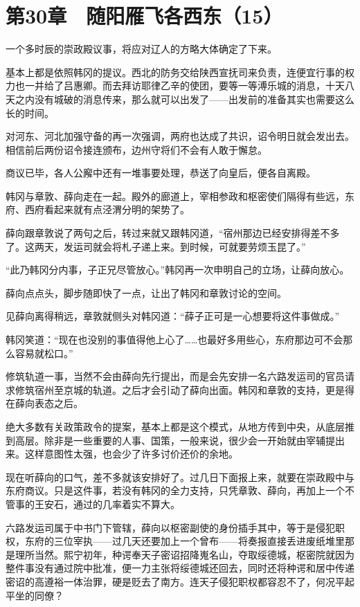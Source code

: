 \section{第30章　随阳雁飞各西东（15）}

一个多时辰的崇政殿议事，将应对辽人的方略大体确定了下来。

基本上都是依照韩冈的提议。西北的防务交给陕西宣抚司来负责，连便宜行事的权力也一并给了吕惠卿。而去拜访耶律乙辛的使团，要等一等溥乐城的消息，十天八天之内没有城破的消息传来，那么就可以出发了——出发前的准备其实也需要这么长的时间。

对河东、河北加强守备的再一次强调，两府也达成了共识，诏令明日就会发出去。相信前后两份诏令接连颁布，边州守将们不会有人敢于懈怠。

商议已毕，各人公廨中还有一堆事要处理，恭送了向皇后，便各自离殿。

韩冈与章敦、薛向走在一起。殿外的廊道上，宰相参政和枢密使们隔得有些远，东府、西府看起来就有点泾渭分明的架势了。

薛向跟章敦说了两句之后，转过来就又跟韩冈道，“宿州那边已经安排得差不多了。这两天，发运司就会将札子递上来。到时候，可就要劳烦玉昆了。”

“此乃韩冈分内事，子正兄尽管放心。”韩冈再一次申明自己的立场，让薛向放心。

薛向点点头，脚步随即快了一点，让出了韩冈和章敦讨论的空间。

见薛向离得稍远，章敦就侧头对韩冈道：“薛子正可是一心想要将这件事做成。”

韩冈笑道：“现在也没别的事值得他上心了……也最好多用些心，东府那边可不会那么容易就松口。”

修筑轨道一事，当然不会由薛向先行提出，而是会先安排一名六路发运司的官员请求修筑宿州至京城的轨道。之后才会引动了薛向出面。韩冈和章敦的支持，更是得在薛向表态之后。

绝大多数有关政策政令的提案，基本上都是这个模式，从地方传到中央，从底层推到高层。除非是一些重要的人事、国策，一般来说，很少会一开始就由宰辅提出来。这样意图性太强，也会少了许多讨价还价的余地。

现在听薛向的口气，差不多就该安排好了。过几日下面报上来，就要在崇政殿中与东府商议。只是这件事，若没有韩冈的全力支持，只凭章敦、薛向，再加上一个不管事的王安石，通过的几率着实不算大。

六路发运司属于中书门下管辖，薛向以枢密副使的身份插手其中，等于是侵犯职权，东府的三位宰执——过几天还要加上一个曾布——将奏报直接丢进废纸堆里那是理所当然。熙宁初年，种谔奉天子密诏招降嵬名山，夺取绥德城，枢密院就因为整件事没有通过院中批准，便一力主张将绥德城还回去，同时还将种谔和居中传递密诏的高遵裕一体治罪，硬是贬去了南方。连天子侵犯职权都容忍不了，何况平起平坐的同僚？

